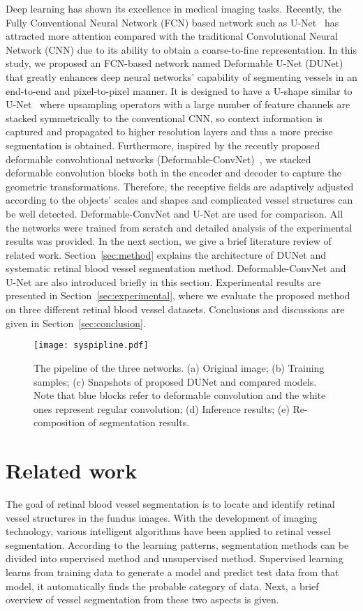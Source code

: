 \documentclass[journal]{IEEEtran}
\begin{document}
Deep learning has shown its excellence in medical imaging tasks. Recently, the Fully Conventional Neural Network (FCN) based network such as U-Net~\cite{ronneberger_u-net:_2015} has attracted more attention compared with the traditional Convolutional Neural Network (CNN) due to its ability to obtain a coarse-to-fine representation. In this study, we proposed an FCN-based network named Deformable U-Net (DUNet) that greatly enhances deep neural networks' capability of segmenting vessels in an end-to-end and pixel-to-pixel manner. It is designed to have a U-shape similar to U-Net~\cite{ronneberger_u-net:_2015} where upsampling operators with a large number of feature channels are stacked symmetrically to the conventional CNN, so context information is captured and propagated to higher resolution layers and thus a more precise segmentation is obtained. Furthermore, inspired by the recently proposed deformable convolutional networks (Deformable-ConvNet)~\cite{dai_deformable_2017}, we stacked deformable convolution blocks both in the encoder and decoder to capture the geometric transformations. Therefore, the receptive fields are adaptively adjusted according to the objects' scales and shapes and complicated vessel structures can be well detected. Deformable-ConvNet and U-Net are used for comparison. All the networks were trained from scratch and detailed analysis of the experimental results was provided. In the next section, we give a brief literature review of related work. Section~\ref{sec:method} explains the architecture of DUNet and systematic retinal blood vessel segmentation method. Deformable-ConvNet and U-Net are also introduced briefly in this section. Experimental results are presented in Section~\ref{sec:experimental}, where we evaluate the proposed method on three different retinal blood vessel datasets. Conclusions and discussions are given in Section~\ref{sec:conclusion}.


\begin{figure*}
\centering
\texttt{[image: syspipline.pdf]}
\caption{The pipeline of the three networks. (a) Original image; (b) Training samples; (c) Snapshots of proposed DUNet and compared models. Note that blue blocks refer to deformable convolution and the white ones represent regular convolution; (d) Inference results; (e) Re-composition of segmentation results.}
\label{fig:syspipline}
\end{figure*}
\section{Related work}
\label{sec:related}
The goal of retinal blood vessel segmentation is to locate and identify retinal vessel structures in the fundus images. With the development of imaging technology, various intelligent algorithms have been applied to retinal vessel segmentation. According to the learning patterns, segmentation methods can be divided into supervised method and unsupervised method. Supervised learning learns from training data to generate a model and predict test data from that model, it automatically finds the probable category of data. Next, a brief overview of vessel segmentation from these two aspects is given.
\end{document}
